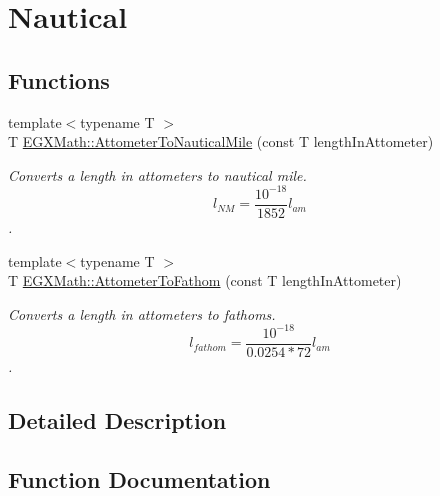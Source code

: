 \hypertarget{group___e_g_x_math-_conversions-_length_conversions-_s_i-_attometer-_nautical}{}\section{Nautical}
\label{group___e_g_x_math-_conversions-_length_conversions-_s_i-_attometer-_nautical}
\subsection*{Functions}
\begin{DoxyCompactItemize}
\item 
{\footnotesize template$<$typename T $>$ }\\T \mbox{\hyperlink{group___e_g_x_math-_conversions-_length_conversions-_s_i-_attometer-_nautical_ga38f0b72d347141e8740bcf9d84a08d25}{E\+G\+X\+Math\+::\+Attometer\+To\+Nautical\+Mile}} (const T length\+In\+Attometer)
\begin{DoxyCompactList}\small\item\em Converts a length in attometers to nautical mile. \[ l_{NM}= \frac{10^{-18}}{1852} l_{am} \]. \end{DoxyCompactList}\item 
{\footnotesize template$<$typename T $>$ }\\T \mbox{\hyperlink{group___e_g_x_math-_conversions-_length_conversions-_s_i-_attometer-_nautical_ga969bc018e3f734e6c4012502d9c6c801}{E\+G\+X\+Math\+::\+Attometer\+To\+Fathom}} (const T length\+In\+Attometer)
\begin{DoxyCompactList}\small\item\em Converts a length in attometers to fathoms. \[ l_{fathom}= \frac{10^{-18}}{0.0254 * 72} l_{am} \]. \end{DoxyCompactList}\end{DoxyCompactItemize}


\subsection{Detailed Description}


\subsection{Function Documentation}
\mbox{\label{group___e_g_x_math-_conversions-_length_conversions-_s_i-_attometer-_nautical_ga969bc018e3f734e6c4012502d9c6c801}} 
